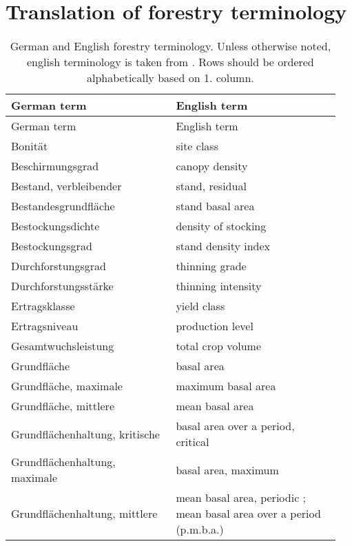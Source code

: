 \section{Translation of forestry terminology}

\begin{singlespace}
  {\tabulinesep=2mm
    \begin{longtabu}{p{0.475\linewidth} p{0.475\linewidth}}
      \caption{German and English forestry terminology. Unless otherwise noted, english terminology is taken from \textcite{Schmid-Haas1990}.  Rows should be ordered alphabetically based on 1. column.} \\
      \toprule
      German term & English term \\
      \midrule
      \endfirsthead
      German term & English term \\
      \midrule
      \endhead
      \bottomrule
      \endlastfoot
      Bonität & site class \\
      Beschirmungsgrad & canopy density \\
      Bestand, verbleibender & stand, residual \\
      Bestandesgrundfläche & stand basal area \\
      Bestockungsdichte & density of stocking \parencite[p.~38]{EFARES1953} \\
      Bestockungsgrad & stand density index \\
      Durchforstungsgrad & thinning grade \\
      Durchforstungsstärke & thinning intensity \\
      Ertragsklasse & yield class \\
      Ertragsniveau & production level \\
      Gesamtwuchsleistung & total crop volume \parencite[p.~152]{Assmann1970} \\
      Grundfläche & basal area \\
      Grundfläche, maximale & maximum basal area \parencite[p.~229]{Assmann1970} \\
      Grundfläche, mittlere & mean basal area \parencite[p.~216]{Assmann1970} \\
      Grundflächenhaltung, kritische & basal area over a period, critical \parencite[p.~229]{Assmann1970} \\
      Grundflächenhaltung, maximale & basal area, maximum \parencite[p.~229]{Assmann1970} \\
      Grundflächenhaltung, mittlere & mean basal area, periodic \parencite[p.~214]{Assmann1970}; mean basal area over a period (p.m.b.a.) \parencite[p.~216]{Assmann1970} \\

\end{longtabu}}
\end{singlespace}

